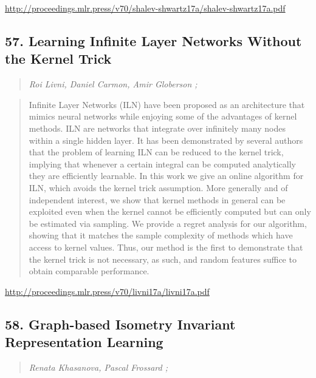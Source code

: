\documentclass{article}
\begin{document}
\href{http://proceedings.mlr.press/v70/shalev-shwartz17a/shalev-shwartz17a.pdf}{http://proceedings.mlr.press/v70/shalev-shwartz17a/shalev-shwartz17a.pdf}

\subsection{57. Learning Infinite Layer Networks Without the Kernel Trick}

\begin{quote}
\footnotesize{\textit{Roi Livni, Daniel Carmon, Amir Globerson ;}}
\end{quote}

\begin{quote}
    Infinite Layer Networks (ILN) have been proposed as an architecture that mimics neural networks while enjoying some of the advantages of kernel methods. ILN are networks that integrate over infinitely many nodes within a single hidden layer. It has been demonstrated by several authors that the problem of learning ILN can be reduced to the kernel trick, implying that whenever a certain integral can be computed analytically they are efficiently learnable. In this work we give an online algorithm for ILN, which avoids the kernel trick assumption. More generally and of independent interest, we show that kernel methods in general can be exploited even when the kernel cannot be efficiently computed but can only be estimated via sampling. We provide a regret analysis for our algorithm, showing that it matches the sample complexity of methods which have access to kernel values. Thus, our method is the first to demonstrate that the kernel trick is not necessary, as such, and random features suffice to obtain comparable performance.  \end{quote}

\href{http://proceedings.mlr.press/v70/livni17a/livni17a.pdf}{http://proceedings.mlr.press/v70/livni17a/livni17a.pdf}

\subsection{58. Graph-based Isometry Invariant Representation Learning}

\begin{quote}
\footnotesize{\textit{Renata Khasanova, Pascal Frossard ;}}
\end{quote}
\end{document}
